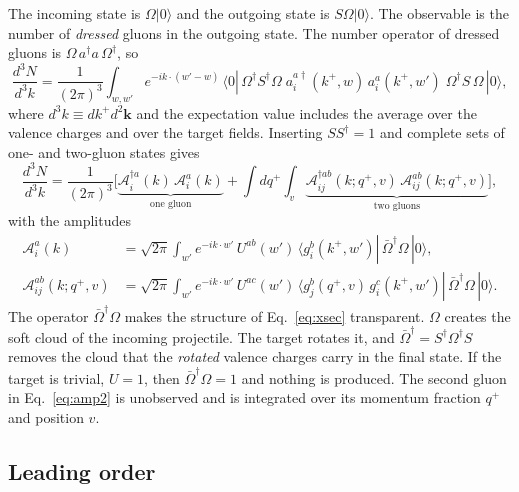 \documentclass[aps,prd,onecolumn,superscriptaddress,nofootinbib,floatfix,longbibliography,11pt]{revtex4-2}
\numberwithin{equation}{section}
\begin{document}
The incoming state is $\Omega|0\rangle$ and the outgoing state is $S\Omega|0\rangle$. The observable is the number of \emph{dressed} gluons in the outgoing state. The number operator of dressed gluons is $\Omega\,a^\dagger a\,\Omega^\dagger$, so
\begin{equation}
\frac{d^3N}{d^3k}=\frac{1}{(2\pi)^3}\int_{w,w'}e^{-ik\cdot(w'-w)}\,\langle0|\,\Omega^\dagger S^\dagger\Omega\;a^{a\dagger}_i(k^+,w)\,a^a_i(k^+,w')\;\Omega^\dagger S\,\Omega\,|0\rangle,
\label{eq:xsec}
\end{equation}
where $d^3k\equiv dk^+d^2\mathbf k$ and the expectation value includes the average over the valence charges and over the target fields. Inserting $SS^\dagger=1$ and complete sets of one- and two-gluon states gives
\begin{equation}
\frac{d^3N}{d^3k}=\frac{1}{(2\pi)^3}\bigg[\underbrace{\mathcal A^{\dagger a}_i(k)\,\mathcal A^a_i(k)}_{\text{one gluon}}+\int dq^+\int_v\underbrace{\mathcal A^{\dagger ab}_{ij}(k;q^+,v)\,\mathcal A^{ab}_{ij}(k;q^+,v)}_{\text{two gluons}}\bigg],
\label{eq:groups}
\end{equation}
with the amplitudes
\begin{align}
\mathcal A^a_i(k)&=\sqrt{2\pi}\int_{w'}e^{-ik\cdot w'}\,U^{ab}(w')\,\langle g^b_i(k^+,w')|\,\bar\Omega^\dagger\Omega\,|0\rangle,\label{eq:amp1}\\
\mathcal A^{ab}_{ij}(k;q^+,v)&=\sqrt{2\pi}\int_{w'}e^{-ik\cdot w'}\,U^{ac}(w')\,\langle g^b_j(q^+,v)\,g^c_i(k^+,w')|\,\bar\Omega^\dagger\Omega\,|0\rangle.\label{eq:amp2}
\end{align}
The operator $\bar\Omega^\dagger\Omega$ makes the structure of Eq.~\eqref{eq:xsec} transparent. $\Omega$ creates the soft cloud of the incoming projectile. The target rotates it, and $\bar\Omega^\dagger=S^\dagger\Omega^\dagger S$ removes the cloud that the \emph{rotated} valence charges carry in the final state. If the target is trivial, $U=1$, then $\bar\Omega^\dagger\Omega=1$ and nothing is produced. The second gluon in Eq.~\eqref{eq:amp2} is unobserved and is integrated over its momentum fraction $q^+$ and position $v$.

\subsection{Leading order}\label{sec:LO}
\end{document}
